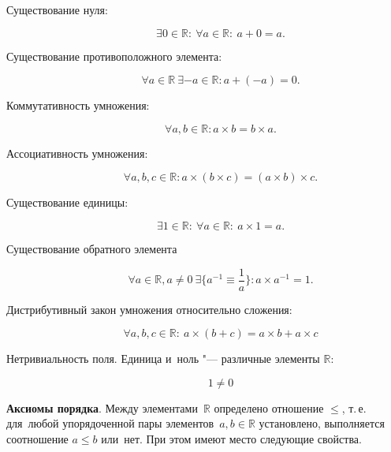 \documentclass[]{scrartcl}
\begin{document}
\begin{description}
\begin{description}
		\item[Существование нуля:]
		\begin{equation}\label{eq:real-numbers-zero-exist}
		\exists 0 \in \mathbb{R}:\ \forall a \in \mathbb{R}:\ a+0=a.
		\end{equation}
		\item[Существование противоположного элемента:]
		\begin{equation}\label{eq:real-numbers-opposite-element}
		\forall a \in \mathbb{R}\ \exists -a \in \mathbb{R}: a+(-a)=0.
		\end{equation}
		\item[Коммутативность умножения:]
		\begin{equation}\label{eq:real-numbers-mult-commutativity}
		\forall a,b \in \mathbb{R}: a \times b=b \times a.
		\end{equation}
		\item[Ассоциативность умножения:]
		\begin{equation}\label{eq:real-numbers-mult-associativity}
		\forall a,b,c \in \mathbb{R}: a \times (b \times c)=(a \times b) \times c.
		\end{equation}
		\item[Существование единицы:]
		\begin{equation}\label{eq:real-numbers-one-exist}
		\exists 1 \in \mathbb{R}:\ \forall a \in \mathbb{R}:\ a \times 1 = a.
		\end{equation}
		\item[Существование обратного элемента]
		\begin{equation}\label{eq:real-numbers-inverse-element}
		\forall a \in \mathbb{R}, a \neq 0 \ \exists \{a^{-1} \equiv \frac{1}{a}\}: a \times a^{-1} = 1.
		\end{equation}
		\item[Дистрибутивный закон умножения относительно сложения:]
		\begin{equation}\label{eq:real-numbers-distributive-rule}
		\forall a,b,c \in \mathbb{R}:\ a \times (b+c) = a \times b + a \times c
		\end{equation}
		\item[Нетривиальность поля. Единица и~ноль "--- различные элементы ${\textstyle \mathbb{R}}$:]
		\begin{equation}\label{eq:real-numbers-zero-one}
		1 \neq 0
		\end{equation}
	\end{description}
	\textbf{Аксиомы порядка}. Между элементами~${\textstyle \mathbb {R} }$ определено отношение ${\textstyle \leqslant }$, т.\,е. для~любой упорядоченной пары элементов~${\textstyle a,b \in \mathbb {R}}$ установлено, выполняется соотношение ${\textstyle a \leqslant b}$ или~нет. При этом имеют место следующие свойства.

\end{description}
\end{document}
